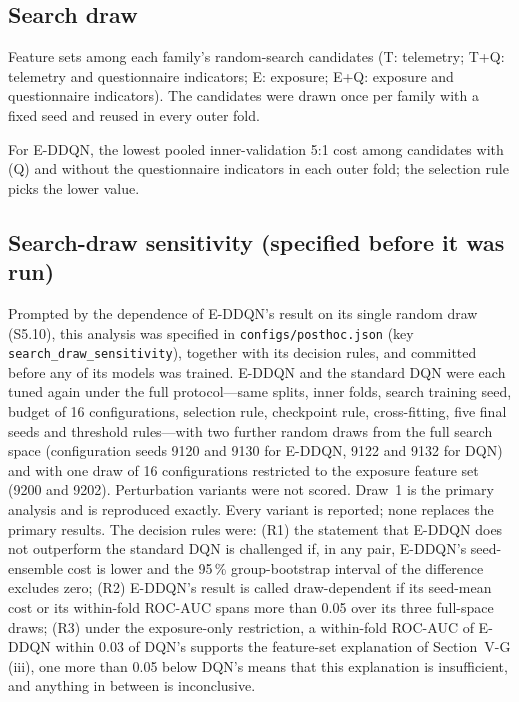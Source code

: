 \begin{center}\footnotesize

\end{center}

\subsection{Search draw}
Feature sets among each family's random-search candidates (T: telemetry; T+Q: telemetry and questionnaire indicators; E: exposure; E+Q: exposure and questionnaire indicators). The candidates were drawn once per family with a fixed seed and reused in every outer fold.

\begin{center}\footnotesize

\end{center}

For E-DDQN, the lowest pooled inner-validation 5:1 cost among candidates with (Q) and without the questionnaire indicators in each outer fold; the selection rule picks the lower value.

\begin{center}\footnotesize

\end{center}


\subsection{Search-draw sensitivity (specified before it was run)}
\label{sec:s-searchdraw}
Prompted by the dependence of E-DDQN's result on its single random draw (S5.10), this analysis was specified in \texttt{configs/\allowbreak posthoc.json} (key \texttt{search\_draw\_sensitivity}), together with its decision rules, and committed before any of its models was trained. E-DDQN and the standard DQN were each tuned again under the full protocol---same splits, inner folds, search training seed, budget of 16 configurations, selection rule, checkpoint rule, cross-fitting, five final seeds and threshold rules---with two further random draws from the full search space (configuration seeds 9120 and 9130 for E-DDQN, 9122 and 9132 for DQN) and with one draw of 16 configurations restricted to the exposure feature set (9200 and 9202). Perturbation variants were not scored. Draw~1 is the primary analysis and is reproduced exactly. Every variant is reported; none replaces the primary results. The decision rules were: (R1) the statement that E-DDQN does not outperform the standard DQN is challenged if, in any pair, E-DDQN's seed-ensemble cost is lower and the 95\,\% group-bootstrap interval of the difference excludes zero; (R2) E-DDQN's result is called draw-dependent if its seed-mean cost or its within-fold ROC-AUC spans more than 0.05 over its three full-space draws; (R3) under the exposure-only restriction, a within-fold ROC-AUC of E-DDQN within 0.03 of DQN's supports the feature-set explanation of Section~V-G (iii), one more than 0.05 below DQN's means that this explanation is insufficient, and anything in between is inconclusive.

